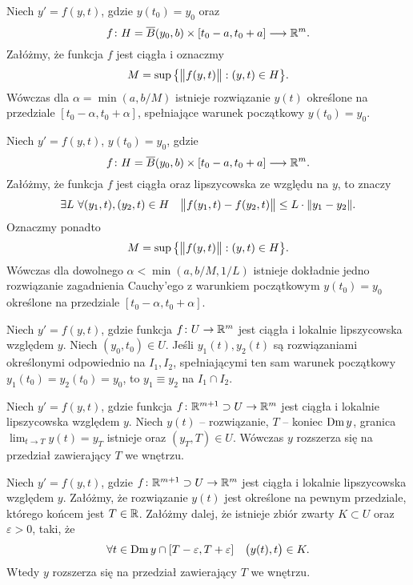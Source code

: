 
\begin{theorem}[Peano]
  Niech $y' = f(y,t)$, gdzie $y(t_0) = y_0$ oraz
  \[
    f \colon H = \overline{B} (y_0, b) \times [t_0 - a, t_0 + a] \longrightarrow \R^m.
  \]
  Załóżmy, że funkcja $f$ jest ciągła i oznaczmy
  \[
    M = \sup \big\{ \norm[\big]{f(y,t)} : (y, t) \in H \big\}.
  \]
  Wówczas dla $\alpha = \min(a, b/M)$ istnieje rozwiązanie $y(t)$ określone na
  przedziale $[t_0 - \alpha, t_0 + \alpha]$, spełniające warunek początkowy $y(t_0) = y_0$.
\end{theorem}

\begin{theorem}
  Niech $y' = f(y,t)$, $y(t_0) = y_0$, gdzie
  \[
    f \colon H = \overline{B} (y_0, b) \times [t_0 - a, t_0 + a] \longrightarrow \R^m.
  \]
  Załóżmy, że funkcja $f$ jest ciągła oraz lipszycowska ze względu na $y$, to znaczy
  \[
    \exists L \ \forall (y_1,t), (y_2,t) \in H \quad
    \norm[\big]{f(y_1,t) - f(y_2,t)} \leq L \cdot \norm{y_1 - y_2}.
  \]
  Oznaczmy ponadto
  \[
    M = \sup \big\{ \norm[\big]{f(y,t)} : (y, t) \in H \big\}.
  \]
  Wówczas dla dowolnego $\alpha < \min(a, b/M, 1/L)$ istnieje dokładnie jedno rozwiązanie
  zagadnienia Cauchy'ego z warunkiem początkowym $y(t_0) = y_0$ określone na przedziale
  $[t_0 - \alpha, t_0 + \alpha]$.
\end{theorem}

\begin{lemma}
  Niech $y' = f(y,t)$, gdzie funkcja $f \colon U \to \R^m$ jest ciągła i lokalnie lipszycowska
  względem $y$. Niech $(y_0,t_0) \in U$. Jeśli $y_1(t), y_2(t)$ są rozwiązaniami określonymi
  odpowiednio na $I_1, I_2$, spełniającymi ten sam warunek początkowy $y_1(t_0) = y_2(t_0) = y_0$,
  to $y_1 \equiv y_2$ na $I_1 \cap I_2$.
\end{lemma}

\begin{lemma}
  Niech $y' = f(y,t)$, gdzie funkcja $f \colon \R^{m+1} \supset U \to \R^m$ jest ciągła i lokalnie
  lipszycowska względem $y$. Niech $y(t)$ -- rozwiązanie, $T$ -- koniec $\domain y$, granica
  $\lim_{t \to T} y(t) = y_T$ istnieje oraz $(y_T, T) \in U$. Wówczas $y$ rozszerza się na przedział
  zawierający $T$ we wnętrzu.
\end{lemma}

\begin{theorem} \label{T: TOPK}
  Niech $y' = f(y,t)$, gdzie $f \colon \R^{m+1} \supset U \to \R^m$ jest ciągła i lokalnie
  lipszycowska względem $y$. Załóżmy, że rozwiązanie $y(t)$ jest określone na pewnym przedziale,
  którego końcem jest $T \in \R$. Załóżmy dalej, że istnieje zbiór zwarty $K \subset U$ oraz
  $\varepsilon > 0$, taki, że
  \[
    \forall t \in \domain y \cap [T - \varepsilon, T + \varepsilon] \quad \p[\big]{y(t), t} \in K.
  \]
  Wtedy $y$ rozszerza się na przedział zawierający $T$ we wnętrzu.
\end{theorem}

